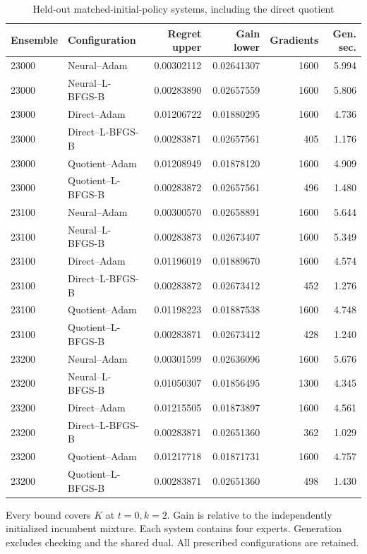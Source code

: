 \begin{table}[htbp]
\caption{Held-out matched-initial-policy systems, including the direct quotient}\label{tab:r23crossed}
\small\begin{tabular}{llrrrr}
\toprule
Ensemble & Configuration & Regret upper & Gain lower & Gradients & Gen. sec.\\\midrule
23000 & Neural--Adam & 0.00302112 & 0.02641307 & 1600 & 5.994\\
23000 & Neural--L-BFGS-B & 0.00283890 & 0.02657559 & 1600 & 5.806\\
23000 & Direct--Adam & 0.01206722 & 0.01880295 & 1600 & 4.736\\
23000 & Direct--L-BFGS-B & 0.00283871 & 0.02657561 & 405 & 1.176\\
23000 & Quotient--Adam & 0.01208949 & 0.01878120 & 1600 & 4.909\\
23000 & Quotient--L-BFGS-B & 0.00283872 & 0.02657561 & 496 & 1.480\\
23100 & Neural--Adam & 0.00300570 & 0.02658891 & 1600 & 5.644\\
23100 & Neural--L-BFGS-B & 0.00283873 & 0.02673407 & 1600 & 5.349\\
23100 & Direct--Adam & 0.01196019 & 0.01889670 & 1600 & 4.574\\
23100 & Direct--L-BFGS-B & 0.00283872 & 0.02673412 & 452 & 1.276\\
23100 & Quotient--Adam & 0.01198223 & 0.01887538 & 1600 & 4.748\\
23100 & Quotient--L-BFGS-B & 0.00283871 & 0.02673412 & 428 & 1.240\\
23200 & Neural--Adam & 0.00301599 & 0.02636096 & 1600 & 5.676\\
23200 & Neural--L-BFGS-B & 0.01050307 & 0.01856495 & 1300 & 4.345\\
23200 & Direct--Adam & 0.01215505 & 0.01873897 & 1600 & 4.561\\
23200 & Direct--L-BFGS-B & 0.00283871 & 0.02651360 & 362 & 1.029\\
23200 & Quotient--Adam & 0.01217718 & 0.01871731 & 1600 & 4.757\\
23200 & Quotient--L-BFGS-B & 0.00283871 & 0.02651360 & 498 & 1.430\\
\bottomrule\end{tabular}
\par\smallskip\parbox{.97\textwidth}{\footnotesize Every bound covers $K$ at $t=0,k=2$. Gain is relative to the independently initialized incumbent mixture. Each system contains four experts. Generation excludes checking and the shared dual. All prescribed configurations are retained.}
\end{table}
